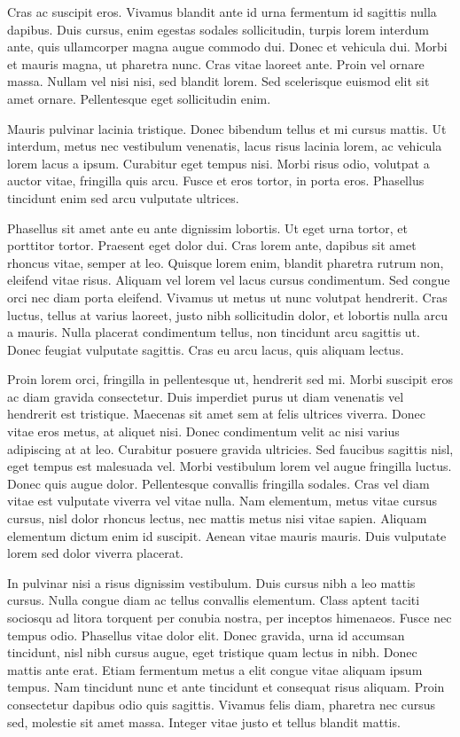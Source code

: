 \documentclass[a4paper]{article}
\begin{document}
Cras ac suscipit eros. Vivamus blandit ante id urna fermentum id sagittis nulla dapibus. Duis cursus, enim egestas sodales sollicitudin, turpis lorem interdum ante, quis ullamcorper magna augue commodo dui. Donec et vehicula dui. Morbi et mauris magna, ut pharetra nunc. Cras vitae laoreet ante. Proin vel ornare massa. Nullam vel nisi nisi, sed blandit lorem. Sed scelerisque euismod elit sit amet ornare. Pellentesque eget sollicitudin enim.

Mauris pulvinar lacinia tristique. Donec bibendum tellus et mi cursus mattis. Ut interdum, metus nec vestibulum venenatis, lacus risus lacinia lorem, ac vehicula lorem lacus a ipsum. Curabitur eget tempus nisi. Morbi risus odio, volutpat a auctor vitae, fringilla quis arcu. Fusce et eros tortor, in porta eros. Phasellus tincidunt enim sed arcu vulputate ultrices.

Phasellus sit amet ante eu ante dignissim lobortis. Ut eget urna tortor, et porttitor tortor. Praesent eget dolor dui. Cras lorem ante, dapibus sit amet rhoncus vitae, semper at leo. Quisque lorem enim, blandit pharetra rutrum non, eleifend vitae risus. Aliquam vel lorem vel lacus cursus condimentum. Sed congue orci nec diam porta eleifend. Vivamus ut metus ut nunc volutpat hendrerit. Cras luctus, tellus at varius laoreet, justo nibh sollicitudin dolor, et lobortis nulla arcu a mauris. Nulla placerat condimentum tellus, non tincidunt arcu sagittis ut. Donec feugiat vulputate sagittis. Cras eu arcu lacus, quis aliquam lectus.

Proin lorem orci, fringilla in pellentesque ut, hendrerit sed mi. Morbi suscipit eros ac diam gravida consectetur. Duis imperdiet purus ut diam venenatis vel hendrerit est tristique. Maecenas sit amet sem at felis ultrices viverra. Donec vitae eros metus, at aliquet nisi. Donec condimentum velit ac nisi varius adipiscing at at leo. Curabitur posuere gravida ultricies. Sed faucibus sagittis nisl, eget tempus est malesuada vel. Morbi vestibulum lorem vel augue fringilla luctus. Donec quis augue dolor. Pellentesque convallis fringilla sodales. Cras vel diam vitae est vulputate viverra vel vitae nulla. Nam elementum, metus vitae cursus cursus, nisl dolor rhoncus lectus, nec mattis metus nisi vitae sapien. Aliquam elementum dictum enim id suscipit. Aenean vitae mauris mauris. Duis vulputate lorem sed dolor viverra placerat.

In pulvinar nisi a risus dignissim vestibulum. Duis cursus nibh a leo mattis cursus. Nulla congue diam ac tellus convallis elementum. Class aptent taciti sociosqu ad litora torquent per conubia nostra, per inceptos himenaeos. Fusce nec tempus odio. Phasellus vitae dolor elit. Donec gravida, urna id accumsan tincidunt, nisl nibh cursus augue, eget tristique quam lectus in nibh. Donec mattis ante erat. Etiam fermentum metus a elit congue vitae aliquam ipsum tempus. Nam tincidunt nunc et ante tincidunt et consequat risus aliquam. Proin consectetur dapibus odio quis sagittis. Vivamus felis diam, pharetra nec cursus sed, molestie sit amet massa. Integer vitae justo et tellus blandit mattis.
\end{document}
